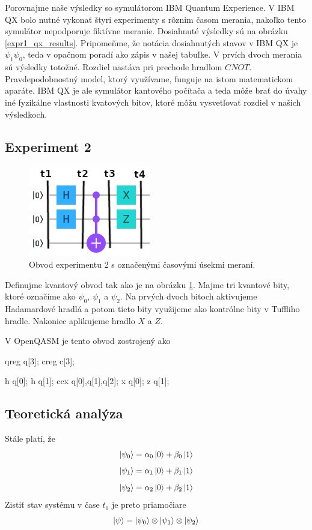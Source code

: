 Porovnajme naše výsledky so symulátorom IBM Quantum Experience. V IBM QX
bolo nutné vykonať štyri experimenty s rôznim časom merania, nakoľko tento
symulátor nepodporuje fiktívne meranie. Dosiahnuté výsledky sú na obrázku
\ref{expr1_qx_results}. Pripomeňme, že notácia dosiahnutých stavov v IBM QX
je \(\psi_1\psi_0\), teda v opačnom poradí ako zápis v našej tabuľke. V 
prvích dvoch merania sú výsledky totožné. Rozdiel nastáva pri prechode hradlom
\(CNOT\). Pravdepodobnostný model, ktorý využívame, funguje na istom 
matematickom aparáte. IBM QX je ale symulátor kantového počítača a teda môže 
brať do úvahy iné fyzikálne vlastnosti kvatových bitov, ktoré môžu vysvetľovať
rozdiel v našich výsledkoch.

\subsection{Experiment 2}
\begin{figure} 
	\centering 
	\includegraphics[width=.5\textwidth]{figures/expr2_circuit.png} 
	\caption{Obvod experimentu 2 s označenými časovými úsekmi meraní.}

    \label{expr2_circuit}
\end{figure}

Definujme kvantový obvod tak ako je na obrázku \ref{expr2_circuit}. Majme 
tri kvantové bity, ktoré označíme ako \(\psi_0\), \(\psi_1\) a \(\psi_2\).
Na prvých dvoch bitoch aktivujeme Hadamardové hradlá a potom tieto bity 
využijeme ako kontrólne bity v Tuffliho hradle. Nakoniec aplikujeme hradlo 
\(X\) a \(Z\).

V OpenQASM je tento obvod zostrojený ako
\begin{code}
qreg q[3];
creg c[3];

h q[0];
h q[1];
ccx q[0],q[1],q[2];
x q[0];
z q[1];
\end{code}

\subsection*{Teoretická analýza}
Stále platí, že
\[\ket{\psi_0} = \alpha_0\ket{0} + \beta_0\ket{1}\]
\[\ket{\psi_1} = \alpha_1\ket{0} + \beta_1\ket{1}\]
\[\ket{\psi_2} = \alpha_2\ket{0} + \beta_2\ket{1}\]
Zistiť stav systému v čase \(t_1\) je preto priamočiare
\[\ket{\psi} = \ket{\psi_0} \otimes \ket{\psi_1} \otimes \ket{\psi_2}\]

